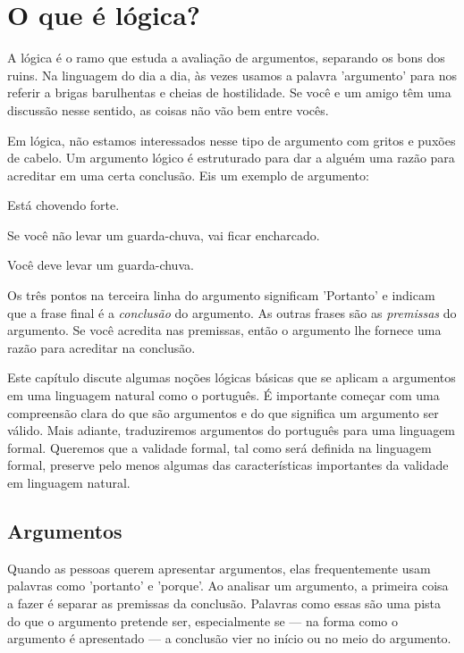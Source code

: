 \chapter{O que é lógica?}
\label{ch.intro}

A lógica é o ramo que estuda a avaliação de argumentos, separando os bons dos ruins. Na linguagem do dia a dia, às vezes usamos a palavra 'argumento' para nos referir a brigas barulhentas e cheias de hostilidade. Se você e um amigo têm uma discussão nesse sentido, as coisas não vão bem entre vocês.

Em lógica, não estamos interessados nesse tipo de argumento com gritos e puxões de cabelo. Um argumento lógico é estruturado para dar a alguém uma razão para acreditar em uma certa conclusão. Eis um exemplo de argumento:

\label{argRaining}
\begin{earg}
\item[(1)] Está chovendo forte.
\item[(2)] Se você não levar um guarda-chuva, vai ficar encharcado.
\item[\therefore] Você deve levar um guarda-chuva.
\end{earg}

Os três pontos na terceira linha do argumento significam 'Portanto' e indicam que a frase final é a \emph{conclusão} do argumento. As outras frases são as \emph{premissas} do argumento. Se você acredita nas premissas, então o argumento lhe fornece uma razão para acreditar na conclusão.

Este capítulo discute algumas noções lógicas básicas que se aplicam a argumentos em uma linguagem natural como o português. É importante começar com uma compreensão clara do que são argumentos e do que significa um argumento ser válido. Mais adiante, traduziremos argumentos do português para uma linguagem formal. Queremos que a validade formal, tal como será definida na linguagem formal, preserve pelo menos algumas das características importantes da validade em linguagem natural.

\section{Argumentos}
Quando as pessoas querem apresentar argumentos, elas frequentemente usam palavras como 'portanto' e 'porque'. Ao analisar um argumento, a primeira coisa a fazer é separar as premissas da conclusão. Palavras como essas são uma pista do que o argumento pretende ser, especialmente se --- na forma como o argumento é apresentado --- a conclusão vier no início ou no meio do argumento.

